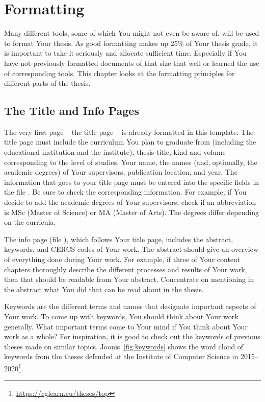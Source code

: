\section{Formatting}  \label{formatting}
Many different tools, some of which You might not even be aware of, will be used to format Your thesis. As good formatting makes up 25\% of Your thesis grade, it is important to take it seriously and allocate sufficient time. Especially if You have not previously formatted documents of that size that well or learned the use of corresponding tools. This chapter looks at the formatting principles for different parts of the thesis.

\subsection{The Title and Info Pages}
The very first page – the title page – is already formatted in this template. The title page must include the curriculum You plan to graduate from (including the educational institution and the institute), thesis title, kind and volume corresponding to the level of studies, Your name, the names (and, optionally, the academic degrees) of Your supervisors, publication location, and year. The information that goes to your title page must be entered into the specific fields in the file . Be sure to check the corresponding information. For example, if You decide to add the academic degrees of Your supervisors, check if an abbreviation is MSc (Master of Science) or MA (Master of Arts). The degrees differ depending on the curricula.  

The info page (file ), which follows Your title page, includes the abstract, keywords, and CERCS codes of Your work. The abstract should give an overview of everything done during Your work. For example, if three of Your content chapters thoroughly describe the different processes and results of Your work, then that should be readable from Your abstract. Concentrate on mentioning in the abstract what You did that can be read about in the thesis.

Keywords are the different terms and names that designate important aspects of Your work. To come up with keywords, You should think about Your work generally. What important terms come to Your mind if You think about Your work as a whole? For inspiration, it is good to check out the keywords of previous theses made on similar topics. Joonis~\ref{fig:keywords} shows the word cloud of keywords from the theses defended at the Institute of Computer Science in 2015–2020\footnote{\url{https://cglearn.eu/theses/top}}.

